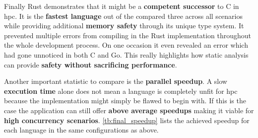 Finally Rust demonstrates that it might be a \textbf{competent successor} to C in \gls{hpc}. It is the \textbf{fastest language} out of the compared three across all scenarios while providing additional \textbf{memory safety} through its unique type system. It prevented multiple errors from compiling in the Rust implementation throughout the whole development process. On one occasion it even revealed an error which had gone unnoticed in both C and Go. This really highlights how static analysis can provide \textbf{safety without sacrificing performance}.

Another important statistic to compare is the \textbf{parallel speedup}. A slow \textbf{execution time} alone does not mean a language is completely unfit for \gls{hpc} because the implementation might simply be flawed to begin with. If this is the case the application can still offer \textbf{above average speedups} making it viable for \textbf{high concurrency scenarios}. \autoref{tb:final_speedup} lists the achieved speedup for each language in the same configurations as above.

